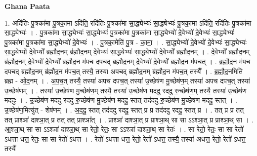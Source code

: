 \documentclass[17pt]{extarticle}
\begin{document}
\textbf{Ghana Paata } \newline

1. अदि॑तिः पु॒त्रका॑मा पु॒त्रका॒मा ऽदि॑ति॒ रदि॑तिः पु॒त्रका॑मा सा॒द्ध्येभ्यः॑ सा॒द्ध्येभ्यः॑ पु॒त्रका॒मा ऽदि॑ति॒ रदि॑तिः पु॒त्रका॑मा सा॒द्ध्येभ्यः॑ । . पु॒त्रका॑मा सा॒द्ध्येभ्यः॑ सा॒द्ध्येभ्यः॑ पु॒त्रका॑मा पु॒त्रका॑मा सा॒द्ध्येभ्यो॑ दे॒वेभ्यो॑ दे॒वेभ्यः॑ सा॒द्ध्येभ्यः॑ पु॒त्रका॑मा पु॒त्रका॑मा सा॒द्ध्येभ्यो॑ दे॒वेभ्यः॑ । . पु॒त्रका॒मेति॑ पु॒त्र - का॒मा॒ । . सा॒द्ध्येभ्यो॑ दे॒वेभ्यो॑ दे॒वेभ्यः॑ सा॒द्ध्येभ्यः॑ सा॒द्ध्येभ्यो॑ दे॒वेभ्यो᳚ ब्रह्मौद॒नम् ब्र॑ह्मौद॒नम् दे॒वेभ्यः॑ सा॒द्ध्येभ्यः॑ सा॒द्ध्येभ्यो॑ दे॒वेभ्यो᳚ ब्रह्मौद॒नम् । . दे॒वेभ्यो᳚ ब्रह्मौद॒नम् ब्र॑ह्मौद॒नम् दे॒वेभ्यो॑ दे॒वेभ्यो᳚ ब्रह्मौद॒न म॑पच दपचद् ब्रह्मौद॒नम् दे॒वेभ्यो॑ दे॒वेभ्यो᳚ ब्रह्मौद॒न म॑पचत् । . ब्र॒ह्मौ॒द॒न म॑पच दपचद् ब्रह्मौद॒नम् ब्र॑ह्मौद॒न म॑पच॒त् तस्यै॒ तस्या॑ अपचद् ब्रह्मौद॒नम् ब्र॑ह्मौद॒न म॑पच॒त् तस्यै᳚ । . ब्र॒ह्मौ॒द॒नमिति॑ ब्रह्म - ओ॒द॒नम् । . अ॒प॒च॒त् तस्यै॒ तस्या॑ अपच दपच॒त् तस्या॑ उ॒च्छेष॑ण मु॒च्छेष॑ण॒म् तस्या॑ अपच दपच॒त् तस्या॑ उ॒च्छेष॑णम् । . तस्या॑ उ॒च्छेष॑ण मु॒च्छेष॑ण॒म् तस्यै॒ तस्या॑ उ॒च्छेष॑ण मददु रददु रु॒च्छेष॑ण॒म् तस्यै॒ तस्या॑ उ॒च्छेष॑ण मददुः । . उ॒च्छेष॑ण मददु रददु रु॒च्छेष॑ण मु॒च्छेष॑ण मददु॒ स्तत् तद॑ददु रु॒च्छेष॑ण मु॒च्छेष॑ण मददु॒ स्तत् । . उ॒च्छेष॑ण॒मित्यु॑त् - शेष॑णम् । . अ॒द॒दु॒ स्तत् तद॑ददु रददु॒ स्तत् प्र प्र तद॑ददु रददु॒ स्तत् प्र । . तत् प्र प्र तत् तत् प्राश्ञा॑ दाश्ञा॒त् प्र तत् तत् प्राश्ञा᳚त् । . प्राश्ञा॑ दाश्ञा॒त् प्र प्राश्ञा॒थ् सा सा ऽऽश्ञा॒त् प्र प्राश्ञा॒थ् सा । . आ॒श्ञा॒थ् सा सा ऽऽश्ञा॑ दाश्ञा॒थ् सा रेतो॒ रेतः॒ सा ऽऽश्ञा॑ दाश्ञा॒थ् सा रेतः॑ । . सा रेतो॒ रेतः॒ सा सा रेतो॑ ऽधत्ता धत्त॒ रेतः॒ सा सा रेतो॑ ऽधत्त । . रेतो॑ ऽधत्ता धत्त॒ रेतो॒ रेतो॑ ऽधत्त॒ तस्यै॒ तस्या॑ अधत्त॒ रेतो॒ रेतो॑ ऽधत्त॒ तस्यै᳚ । \newline
\end{document}
